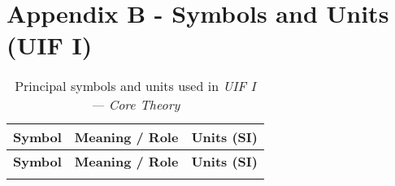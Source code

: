 \section*{Appendix B - Symbols and Units (UIF I)}
\begin{longtable}{@{}%
  >{\RaggedRight\arraybackslash}p{}%
  >{\RaggedRight\arraybackslash}p{}%
  >{\RaggedRight\arraybackslash}p{}%
@{}}
\caption{Principal symbols and units used in \textit{UIF I — Core Theory}}
\label{tab:symbols_UIF1}\\
\toprule
\textbf{Symbol} & \textbf{Meaning / Role} & \textbf{Units (SI)}\\
\midrule
\endfirsthead

\toprule
\textbf{Symbol} & \textbf{Meaning / Role} & \textbf{Units (SI)}\\
\midrule
\endhead

\bottomrule
\endfoot


\end{longtable}
